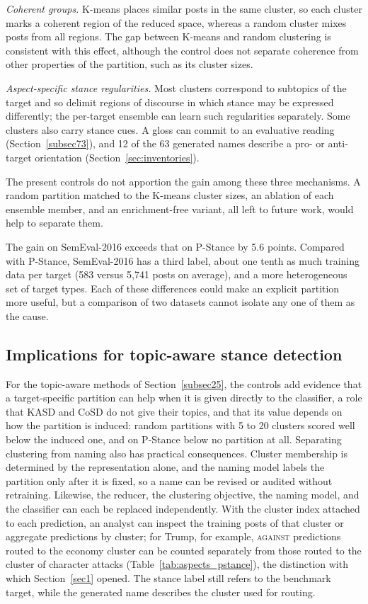 \documentclass[pdflatex,sn-mathphys-num,iicol]{sn-jnl}%
\begin{document}
\emph{Coherent groups.} K-means places similar posts in the same cluster, so each cluster marks a coherent region of the reduced space, whereas a random cluster mixes posts from all regions. The gap between K-means and random clustering is consistent with this effect, although the control does not separate coherence from other properties of the partition, such as its cluster sizes.

\emph{Aspect-specific stance regularities.} Most clusters correspond to subtopics of the target and so delimit regions of discourse in which stance may be expressed differently; the per-target ensemble can learn such regularities separately. Some clusters also carry stance cues. A gloss can commit to an evaluative reading (Section~\ref{subsec73}), and 12 of the 63 generated names describe a pro- or anti-target orientation (Section~\ref{sec:inventories}).

The present controls do not apportion the gain among these three mechanisms. A random partition matched to the K-means cluster sizes, an ablation of each ensemble member, and an enrichment-free variant, all left to future work, would help to separate them.

The gain on SemEval-2016 exceeds that on P-Stance by 5.6 points. Compared with P-Stance, SemEval-2016 has a third label, about one tenth as much training data per target (583 versus 5{,}741 posts on average), and a more heterogeneous set of target types. Each of these differences could make an explicit partition more useful, but a comparison of two datasets cannot isolate any one of them as the cause.

\subsection{Implications for topic-aware stance detection}\label{subsec72}

For the topic-aware methods of Section~\ref{subsec25}, the controls add evidence that a target-specific partition can help when it is given directly to the classifier, a role that KASD and CoSD do not give their topics, and that its value depends on how the partition is induced: random partitions with 5 to 20 clusters scored well below the induced one, and on P-Stance below no partition at all. Separating clustering from naming also has practical consequences. Cluster membership is determined by the representation alone, and the naming model labels the partition only after it is fixed, so a name can be revised or audited without retraining. Likewise, the reducer, the clustering objective, the naming model, and the classifier can each be replaced independently. With the cluster index attached to each prediction, an analyst can inspect the training posts of that cluster or aggregate predictions by cluster; for Trump, for example, \textsc{against} predictions routed to the economy cluster can be counted separately from those routed to the cluster of character attacks (Table~\ref{tab:aspects_pstance}), the distinction with which Section~\ref{sec1} opened. The stance label still refers to the benchmark target, while the generated name describes the cluster used for routing.
\end{document}
